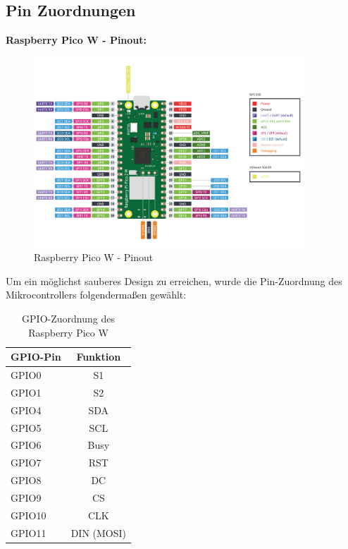 \begin{inhalt}
\section{Pin Zuordnungen} \label{sec:Pin_Zuordnungen}

\textbf{Raspberry Pico W - Pinout:}

\begin{figure}[!htb]
\centering
\includegraphics[width=0.90\textwidth]{files/Tobias/pics/Pinout/pico2w-pinout.pdf}
\caption[Raspberry Pico W - Pinout]{Raspberry Pico W - Pinout}
\label{fig:PicoW_Pinout}
\end{figure}




Um ein möglichst sauberes Design zu erreichen, wurde die Pin-Zuordnung des Mikrocontrollers folgendermaßen gewählt:

\renewcommand{\arraystretch}{1}

\begin{table}[H]
\centering
{}
\begin{tabular}{|l|c|}
\hline
\rowcolor{cyan!20}
\textbf{GPIO-Pin} & \textbf{Funktion} \\
\hline
GPIO0 & S1 \\
\hline
GPIO1 & S2 \\
\hline
GPIO4 & SDA \\
\hline
GPIO5 & SCL \\
\hline
GPIO6 & Busy \\
\hline
GPIO7 & RST \\
\hline
GPIO8 & DC \\
\hline
GPIO9 & CS \\
\hline
GPIO10 & CLK \\
\hline
GPIO11 & DIN (MOSI) \\
\hline
\end{tabular}
\caption{GPIO-Zuordnung des Raspberry Pico W}
\label{tab:GPIO_Zuordnung}
\end{table}



\end{inhalt}
